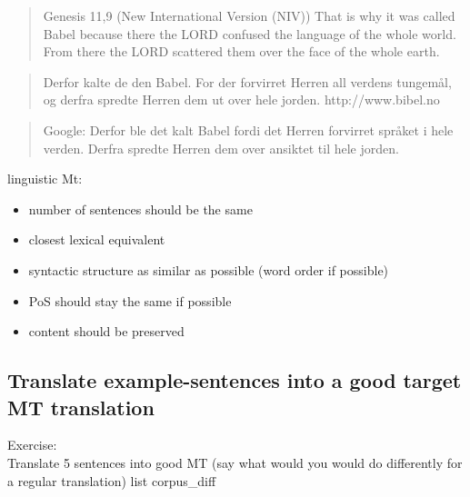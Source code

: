 \documentclass[a4paper,english,12pt]{article}
\begin{document}
\begin{spacing}{1.0}
\begin{quote}
Genesis 11,9 (New International Version (NIV))
That is why it was called Babel because there the LORD confused the language of the whole world. From there the LORD scattered them over the face of the whole earth.
\end{quote}

\begin{quote}
Derfor kalte de den Babel. For der forvirret Herren all verdens tungemål, og derfra spredte Herren dem ut over hele jorden.
http://www.bibel.no
\end{quote}

\begin{quote}
Google:
Derfor ble det kalt Babel fordi det Herren forvirret språket i hele verden. Derfra spredte Herren dem over ansiktet til hele jorden.
\end{quote}


linguistic Mt:
\begin{itemize}
\item number of sentences should be the same
\item closest lexical equivalent
\item syntactic structure as similar as possible (word order if possible)
\item PoS should stay the same if possible
\item content should be preserved
\end{itemize}


\subsection{Translate example-sentences into a good target MT translation}

Exercise:\\
Translate 5 sentences into good MT (say what would you would do differently for a regular translation)
list corpus_diff



\end{spacing}
\end{document}
